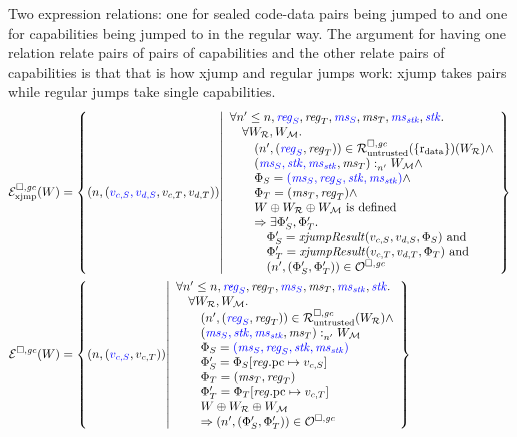 \documentclass[a4paper]{article}
\begin{document}
Two expression relations: one for sealed code-data pairs being jumped to and one for capabilities being jumped to in the regular way.
The argument for having one relation relate pairs of pairs of capabilities and the other relate pairs of capabilities is that that is how xjump and regular jumps work: xjump takes pairs while regular jumps take single capabilities.
\begin{align*}
  \lrexj(W) &= \left\{ \npair{\stpair[.]{v_{c,S},v_{d,S}}{v_{c,T},v_{d,T}}} \middle| 
    \begin{array}{l}
      \forall n' \leq n, \src{\reg_S}, \reg_T, \src{\ms_S}, \ms_T, \src{\ms_\stk}, \src{\stk} \ldotp\\
      \quad \forall W_\lrrs , W_\lrm \ldotp \\
      \qquad\npair[n']{\stpair{\reg}{\reg}} \in \lrr(\{\rdata\}) (W_\lrrs ) \wedge\\
      \qquad\memSat[n']{\stpair[.]{\ms_S,\stk,\ms_\stk}{\ms_T}}{W_\lrm} \wedge \\
      \qquad\Phi_S = \src{(\ms_S,\reg_S,\stk, \ms_\stk)}\wedge\\
      \qquad\Phi_T = (\ms_T,\reg_T) \wedge\\
      \qquad W \oplus W_\lrrs \oplus W_\lrm \text{ is defined }\\
      \qquad\Rightarrow \exists \Phi_S',\Phi_T'\ldotp\\
      \quad\qquad \Phi_S' = \xjumpResult{v_{c,S}}{v_{d,S}}{\Phi_S} \tand\\
      \quad\qquad\Phi_T' = \xjumpResult{v_{c,T}}{v_{d,T}}{\Phi_T}\tand\\
      \quad\qquad\npair[n']{\left(\Phi_S', \Phi_T' \right)}\in \lro
    \end{array}
    \right\}\\
  \lre(W) &= \left\{ \npair{\stpair[.]{v_{c,S}}{v_{c,T}}} \middle| 
    \begin{array}{l}
      \forall n' \leq n, \src{\reg_S}, \reg_T, \src{\ms_S}, \ms_T, \src{\ms_\stk}, \src{\stk} \ldotp\\
      \quad \forall W_\lrrs , W_\lrm \ldotp \\
      \qquad\npair[n']{\stpair{\reg}{\reg}} \in \lrr(W_\lrrs ) \wedge\\
      \qquad\memSat[n']{\stpair[.]{\ms_S,\stk,\ms_\stk}{\ms_T}}{W_\lrm} \\
      \qquad\Phi_S = \src{(\ms_S,\reg_S,\stk, \ms_\stk)}\\
      \qquad \Phi_S' = \Phi_S \updReg{\pcreg}{v_{c,S}}\\
      \qquad\Phi_T = (\ms_T,\reg_T)\\
      \qquad\Phi_T' = \Phi_T\updReg{\pcreg}{v_{c,T}}\\
      \qquad W \oplus W_\lrrs \oplus W_\lrm\\
      \qquad\Rightarrow\npair[n']{\left(\Phi_S', \Phi_T' \right)}\in \lro
    \end{array}
    \right\}
\end{align*}
 
\end{document}
